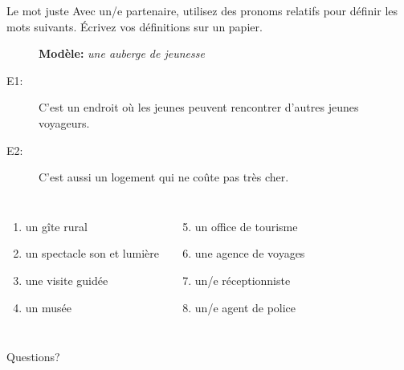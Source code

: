 \documentclass{beamer}
\begin{document}
  \begin{frame}{Le mot juste}
    Avec un/e partenaire, utilisez des pronoms relatifs pour définir les mots suivants.
    Écrivez vos définitions sur un papier.
    \begin{description}
      \item[] \textbf{Modèle:} \textit{une auberge de jeunesse}
      \item[E1:] C'est un endroit \alert{où} les jeunes peuvent rencontrer d'autres jeunes voyageurs.
      \item[E2:] C'est aussi un logement \alert{qui} ne coûte pas très cher.
    \end{description}
    \begin{columns}[t]
        \begin{enumerate}
          \item un gîte rural
          \item un spectacle son et lumière
          \item une visite guidée
          \item un musée
        \end{enumerate}
        \begin{enumerate}
          \setcounter{enumi}{4}
          \item un office de tourisme
          \item une agence de voyages
          \item un/e réceptionniste
          \item un/e agent de police
        \end{enumerate}
    \end{columns}
  \end{frame}

  \begin{frame}{}
    \begin{center}
      \Large Questions?
    \end{center}
  \end{frame}
\end{document}
